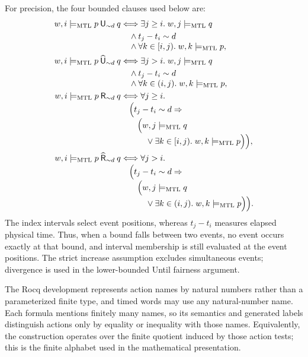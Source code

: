 \documentclass[10pt,journal,compsoc]{IEEEtran}
\newcommand{\satM}{\models_{\mathrm{MTL}}}
\newcommand{\Until}{\mathbin{\mathsf{U}}}
\newcommand{\Release}{\mathbin{\mathsf{R}}}
\newcommand{\hUntil}{\mathbin{\widehat{\mathsf{U}}}}
\newcommand{\hRelease}{\mathbin{\widehat{\mathsf{R}}}}
\begin{document}
For precision, the four bounded clauses used below are:
\begin{align*}
 w,i\satM p\Until_{\sim d}q
 &\Longleftrightarrow \exists j\ge i.\; w,j\satM q\\
 &\quad\land t_j-t_i\sim d\\[-1mm]
 &\quad\land \forall k\in[i,j).\;w,k\satM p,\\
 w,i\satM p\hUntil_{\sim d}q
 &\Longleftrightarrow \exists j>i.\; w,j\satM q\\
 &\quad\land t_j-t_i\sim d\\[-1mm]
 &\quad\land \forall k\in(i,j).\;w,k\satM p,\\
 w,i\satM p\Release_{\sim d}q
 &\Longleftrightarrow \forall j\ge i.\\[-1mm]
 &\quad\Bigl(t_j-t_i\sim d\Rightarrow\\[-1mm]
 &\qquad\Bigl(w,j\satM q\\[-1mm]
 &\qquad\quad\lor \exists k\in[i,j).\;w,k\satM p\Bigr)\Bigr),\\
 w,i\satM p\hRelease_{\sim d}q
 &\Longleftrightarrow \forall j>i.\\[-1mm]
 &\quad\Bigl(t_j-t_i\sim d\Rightarrow\\[-1mm]
 &\qquad\Bigl(w,j\satM q\\[-1mm]
 &\qquad\quad\lor \exists k\in(i,j).\;w,k\satM p\Bigr)\Bigr).
\end{align*}
The index intervals select event positions, whereas $t_j-t_i$ measures
elapsed physical time. Thus, when a bound falls between two events, no event
occurs exactly at that bound, and interval membership is still evaluated at
the event positions.
The strict increase assumption excludes simultaneous events; divergence is
used in the lower-bounded Until fairness argument.

The Rocq development represents action names by natural numbers rather than a
parameterized finite type, and timed words may use any natural-number name.
Each formula mentions finitely many names, so its semantics and generated
labels distinguish actions only by equality or inequality with those names.
Equivalently, the construction operates over the finite quotient induced by
those action tests; this is the finite alphabet used in the mathematical
presentation.
\end{document}

